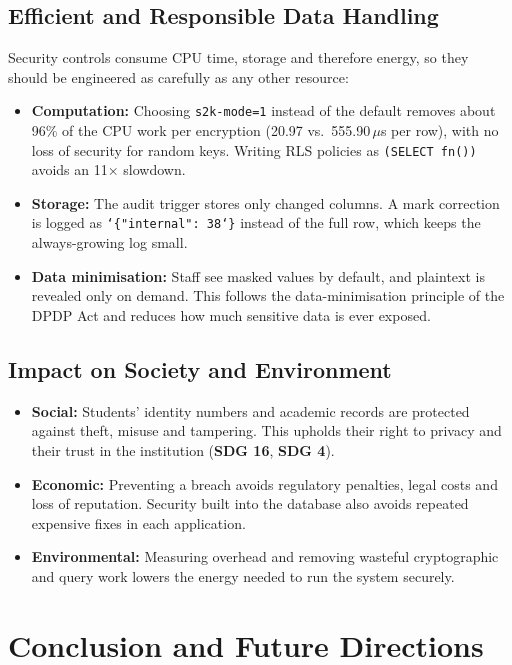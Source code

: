 \documentclass[11pt,a4paper]{report}
\begin{document}
\subsection{Efficient and Responsible Data Handling}
Security controls consume CPU time, storage and therefore energy, so they should be engineered as carefully as any other resource:
\begin{itemize}
    \item \textbf{Computation:} Choosing \texttt{s2k-mode=1} instead of the default removes about 96\% of the CPU work per encryption (20.97 vs.\ 555.90\,$\mu$s per row), with no loss of security for random keys. Writing RLS policies as \texttt{(SELECT fn())} avoids an 11$\times$ slowdown.
    \item \textbf{Storage:} The audit trigger stores only changed columns. A mark correction is logged as \texttt{\char`\{"internal": 38\char`\}} instead of the full row, which keeps the always-growing log small.
    \item \textbf{Data minimisation:} Staff see masked values by default, and plaintext is revealed only on demand. This follows the data-minimisation principle of the DPDP Act and reduces how much sensitive data is ever exposed.
\end{itemize}

\subsection{Impact on Society and Environment}
\begin{itemize}
    \item \textbf{Social:} Students' identity numbers and academic records are protected against theft, misuse and tampering. This upholds their right to privacy and their trust in the institution (\textbf{SDG 16}, \textbf{SDG 4}).
    \item \textbf{Economic:} Preventing a breach avoids regulatory penalties, legal costs and loss of reputation. Security built into the database also avoids repeated expensive fixes in each application.
    \item \textbf{Environmental:} Measuring overhead and removing wasteful cryptographic and query work lowers the energy needed to run the system securely.
\end{itemize}


\section{Conclusion and Future Directions}
\end{document}
